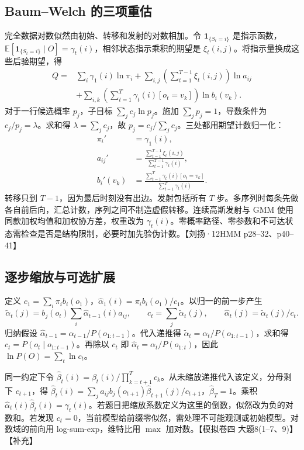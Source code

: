 \documentclass[UTF8,a4paper,zihao=-4,fontset=fandol]{ctexrep}
\begin{document}
\subsection{Baum–Welch 的三项重估}
完全数据对数似然由初始、转移和发射的对数相加。令 $\mathbf1_{\{S_t=i\}}$ 是指示函数，$\mathbb E[\mathbf1_{\{S_t=i\}}\mid O]=\gamma_t(i)$，相邻状态指示乘积的期望是 $\xi_t(i,j)$。将指示量换成这些后验期望，得
\[
\begin{aligned}
Q={}&\sum_i\gamma_1(i)\ln\pi_i
 +\sum_{i,j}\left(\sum_{t=1}^{T-1}\xi_t(i,j)\right)\ln a_{ij}\\
&+\sum_{i,k}\left(\sum_{t=1}^{T}\gamma_t(i)[o_t=v_k]\right)\ln b_i(v_k).
\end{aligned}
\]
对于一行候选概率 $p_j$，子目标 $\sum_j c_j\ln p_j$。施加 $\sum_jp_j=1$，导数条件为 $c_j/p_j=\lambda$。求和得 $\lambda=\sum_jc_j$，故 $p_j=c_j/\sum_jc_j$。三处都用期望计数归一化：
\[
\begin{aligned}
\pi_i'&=\gamma_1(i),\\
a_{ij}'&=\frac{\sum_{t=1}^{T-1}\xi_t(i,j)}{\sum_{t=1}^{T-1}\gamma_t(i)},\\
b_i'(v_k)&=\frac{\sum_{t=1}^{T}\gamma_t(i)[o_t=v_k]}{\sum_{t=1}^{T}\gamma_t(i)}.
\end{aligned}
\]
转移只到 $T-1$，因为最后时刻没有出边。发射包括所有 $T$ 步。多序列时每条先做各自前后向，汇总计数，序列之间不制造虚假转移。连续高斯发射与 GMM 使用同款加权均值和加权协方差，权重改为 $\gamma_t(i)$。零概率路径、零参数和不可达状态需检查是否是结构限制，必要时加先验伪计数。【刘扬·12HMM p28–32、p40–41】

\subsection{逐步缩放与可选扩展}
定义 $c_1=\sum_i\pi_i b_i(o_1)$，$\hat\alpha_1(i)=\pi_i b_i(o_1)/c_1$。以归一的前一步产生
\[
\tilde\alpha_t(j)=b_j(o_t)\sum_i\hat\alpha_{t-1}(i)a_{ij},\qquad
c_t=\sum_j\tilde\alpha_t(j),\qquad
\hat\alpha_t(j)=\tilde\alpha_t(j)/c_t .
\]
归纳假设 $\hat\alpha_{t-1}=\alpha_{t-1}/P(o_{1:t-1})$。代入递推得 $\tilde\alpha_t=\alpha_t/P(o_{1:t-1})$，求和得 $c_t=P(o_t\mid o_{1:t-1})$。再除以 $c_t$ 即 $\hat\alpha_t=\alpha_t/P(o_{1:t})$，因此 $\ln P(O)=\sum_t\ln c_t$。

同一约定下令 $\hat\beta_t(i)=\beta_t(i)/\prod_{k=t+1}^T c_k$。从未缩放递推代入该定义，分母剩下 $c_{t+1}$，得 $\hat\beta_t(i)=\sum_j a_{ij}b_j(o_{t+1})\hat\beta_{t+1}(j)/c_{t+1}$，$\hat\beta_T=1$。乘积 $\hat\alpha_t(i)\hat\beta_t(i)=\gamma_t(i)$。若题目把缩放系数定义为这里的倒数，似然改为负的对数和。若发现 $c_t=0$，当前模型给前缀零似然，需处理不可能观测或初始模型。对数域的前向用 log-sum-exp，维特比用 $\max$ 加对数。【模拟卷四 大题8(1–7、9)】【补充】
\end{document}
